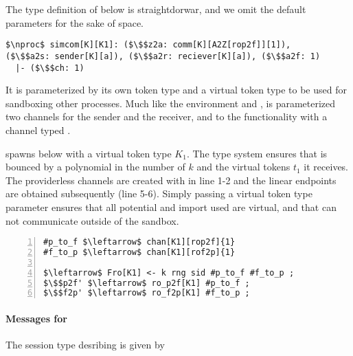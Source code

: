 The type definition of \simcom below is straightdorwar, and we omit the default parameters for the sake of space.
\begin{lstlisting}[basicstyle=\footnotesize\BeraMonottFamily, mathescape, frame=single]
$\nproc$ simcom[K][K1]: ($\$$z2a: comm[K][A2Z[rop2f]][1]),
($\$$a2s: sender[K][a]), ($\$$a2r: reciever[K][a]), ($\$$a2f: 1) 
  |- ($\$$ch: 1)
\end{lstlisting}
It is parameterized by its own token type  and a virtual token type  to be used for sandboxing other processes.
Much like the environment and \Fcom, \simcom is parameterized  two channels for the sender and the receiver, and to the functionality with a channel typed .

\simcom spawns \Fro below with a virtual token type $K_1$. The type system ensures that \Fro is bounced by a polynomial \GlobalF in the number of $k$ and the virtual tokens $t_1$ it receives.
The providerless channels are created with  in line 1-2 and the linear endpoints are obtained subsequently (line 5-6).
Simply passing a virtual token type parameter ensures that all potential and import used are virtual, and that \Fro can not communicate outside of the sandbox.
\begin{lstlisting}[basicstyle=\footnotesize\BeraMonottFamily, mathescape, frame=single, numbers=left, xleftmargin=2em, xrightmargin=2em]
#p_to_f $\leftarrow$ chan[K1][rop2f]{1}
#f_to_p $\leftarrow$ chan[K1][rof2p]{1}

$\leftarrow$ Fro[K1] <- k rng sid #p_to_f #f_to_p ;
$\$$p2f' $\leftarrow$ ro_p2f[K1] #p_to_f ;
$\$$f2p' $\leftarrow$ ro_f2p[K1] #f_to_p ;
\end{lstlisting}


\paragraph{Messages for \Fro}
The session type desribing \Fro is given by

